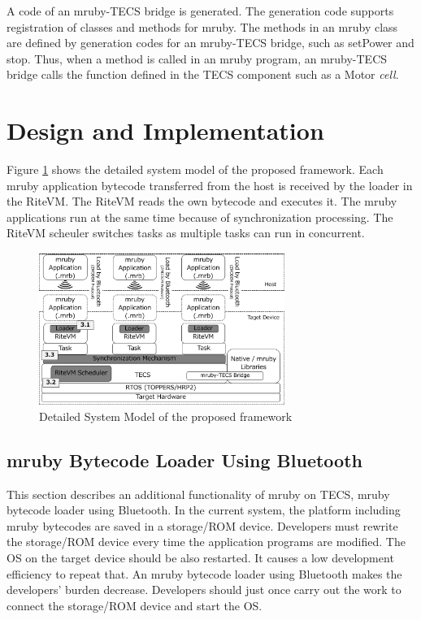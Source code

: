 \documentclass[conference,compsoc]{IEEEtran}
\begin{document}
A code of an mruby-TECS bridge is generated.
The generation code supports registration of classes and methods for mruby.
The methods in an mruby class are defined by generation codes for an mruby-TECS bridge, such as setPower and stop.
Thus, when a method is called in an mruby program, an mruby-TECS bridge calls the function defined in the TECS component such as a Motor {\it cell}.

\section{Design and Implementation}
\label{sec:Design and Implementation}
Figure \ref{fig:system_model} shows the detailed system model of the proposed framework.
Each mruby application bytecode transferred from the host is received by the loader in the RiteVM.
The RiteVM reads the own bytecode and executes it.
The mruby applications run at the same time because of synchronization processing.
The RiteVM scheuler switches tasks as multiple tasks can run in concurrent.

\begin{figure}[t]
    \centering
    \includegraphics[width=8cm,clip]{figure/system_model.pdf}
    \caption{Detailed System Model of the proposed framework}
    \label{fig:system_model}
\end{figure}

\subsection{mruby Bytecode Loader Using Bluetooth}
\label{sec:mruby bytecode loader using Bluetooth}
This section describes an additional functionality of mruby on TECS, mruby bytecode loader using Bluetooth.
In the current system, the platform including mruby bytecodes are saved in a storage/ROM device.
Developers must rewrite the storage/ROM device every time the application programs are modified.
The OS on the target device should be also restarted.
It causes a low development efficiency to repeat that.
An mruby bytecode loader using Bluetooth makes the developers' burden decrease.
Developers should just once carry out the work to connect the storage/ROM device and start the OS. 
\end{document}
